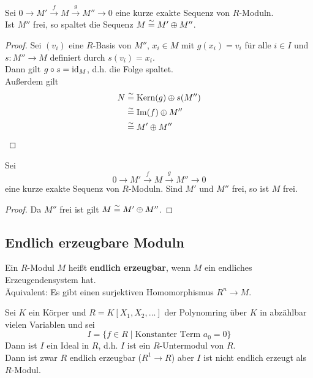	\begin{satz}
		Sei $0\to M'\xrightarrow{f}M\xrightarrow{g}M''\to 0$ eine kurze exakte Sequenz von $R$-Moduln.\\
		Ist $M''$ frei, so spaltet die Sequenz $M\overset{\sim}{=} M'\oplus M''$.
	\end{satz}
	\begin{proof}
		Sei $(v_i)$ eine $R$-Basis von $M''$, $x_i\in M$ mit $g(x_i)=v_i$ für alle $i\in I$ und $s:M''\to M$ definiert durch $s(v_i)=x_i$.\\
		Dann gilt $g\circ s=\operatorname{id}_M$, d.h. die Folge spaltet.\\
		Außerdem gilt
		\begin{align*}
		N&\overset{\sim}{=}\operatorname{Kern}(g)\oplus s(M'')\\
		&\overset{\sim}{=}\operatorname{Im}(f)\oplus M''\\
		&\overset{\sim}{=} M'\oplus M''
		\end{align*}
	\end{proof}
	
	\begin{kor}
		Sei
		\[0\to M'\xrightarrow{f}M\xrightarrow{g}M''\to 0\]
		eine kurze exakte Sequenz von $R$-Moduln. Sind $M'$ und $M''$  frei, so ist $M$ frei.
	\end{kor}
	\begin{proof}
		Da $M''$ frei ist gilt $M\overset{\sim}{=} M'\oplus M''$.
	\end{proof}

	\subsection{Endlich erzeugbare Moduln}
	\begin{definition}
		Ein $R$-Modul $M$ heißt \textbf{endlich erzeugbar}, wenn $M$ ein endliches Erzeugendensystem hat.\\
		Äquivalent: Es gibt einen surjektiven Homomorphismus $R^n\to M$.
	\end{definition}

	\begin{exm}
		Sei $K$ ein Körper und $R=K[X_1,X_2,...]$ der Polynomring über $K$ in abzählbar vielen Variablen und sei
		\[I=\{f\in R\mid \text{Konstanter Term }a_0=0\}\]
		Dann ist $I$ ein Ideal in $R$, d.h. $I$ ist ein $R$-Untermodul von $R$.\\
		Dann ist zwar $R$ endlich erzeugbar ($R^1\to R$) aber $I$ ist nicht endlich erzeugt als $R$-Modul.
	\end{exm}

